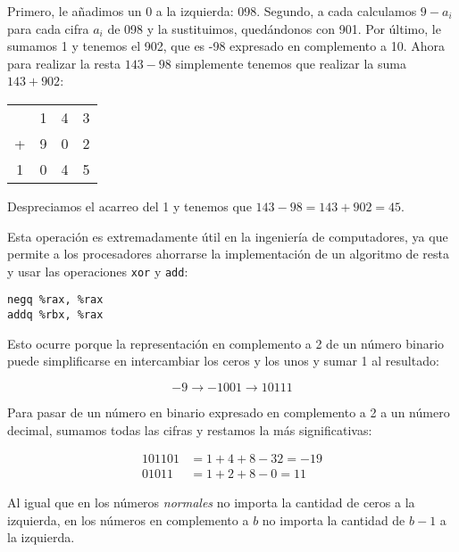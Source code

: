Primero, le añadimos un 0 a la izquierda: 098.
Segundo, a cada calculamos $9 - a_i$ para cada cifra $a_i$ de 098 y la sustituimos, quedándonos con 901.
Por último, le sumamos 1 y tenemos el 902, que es -98 expresado en complemento a 10.
Ahora para realizar la resta $143 - 98$ simplemente tenemos que realizar la suma $143 + 902$:

\begin{center}
\setlength{\tabcolsep}{1ex}
\begin{tabular}{c c c c}
  & 1 & 4 & 3 \\
+ & 9 & 0 & 2 \\
\midrule
1 & 0 & 4 & 5 \\
\end{tabular}
\end{center}

Despreciamos el acarreo del 1 y tenemos que $143 - 98 = 143 + 902 = 45$.

Esta operación es extremadamente útil en la ingeniería de computadores, ya que permite a los procesadores ahorrarse la implementación de un algoritmo de resta y usar las operaciones \texttt{xor} y \texttt{add}:

\begin{lstlisting}[language={[x86masm]Assembler}]
negq %rax, %rax
addq %rbx, %rax
\end{lstlisting}

Esto ocurre porque la representación en complemento a 2 de un número binario puede simplificarse en intercambiar los ceros y los unos y sumar 1 al resultado:

\[-9 \rightarrow -1001 \rightarrow 10111\]

Para pasar de un número en binario expresado en complemento a 2 a un número decimal, sumamos todas las cifras y restamos la más significativas:

\begin{align*}
	101101 & = 1 + 4 + 8 - 32 = -19 \\
	01011  & = 1 + 2 + 8 - 0 = 11
\end{align*}

Al igual que en los números \textit{normales} no importa la cantidad de ceros a la izquierda, en los números en complemento a $b$ no importa la cantidad de $b-1$ a la izquierda.
